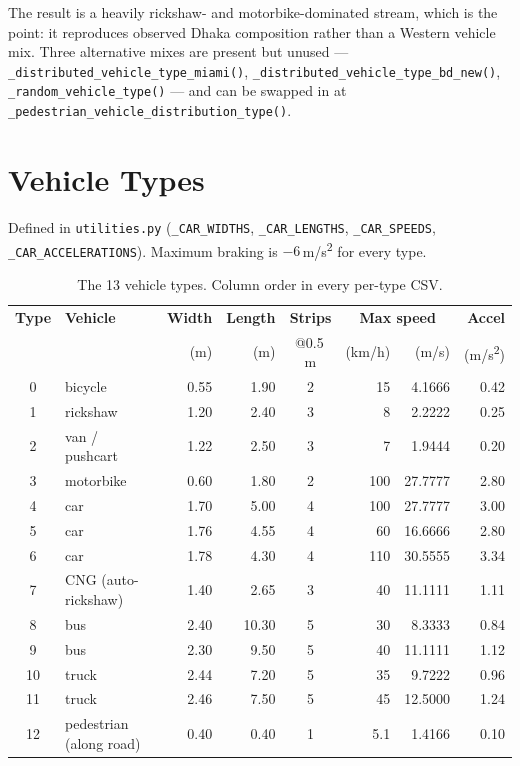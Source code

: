 \documentclass[11pt, a4paper]{article}
\newcommand{\code}[1]{\texttt{#1}}
\begin{document}
The result is a heavily rickshaw- and motorbike-dominated stream, which is the
point: it reproduces observed Dhaka composition rather than a Western vehicle
mix. Three alternative mixes are present but unused ---
\code{\_distributed\_vehicle\_type\_miami()},
\code{\_distributed\_vehicle\_type\_bd\_new()},
\code{\_random\_vehicle\_type()} --- and can be swapped in at
\code{\_pedestrian\_vehicle\_distribution\_type()}.

\section{Vehicle Types}

Defined in \code{utilities.py} (\code{\_CAR\_WIDTHS}, \code{\_CAR\_LENGTHS},
\code{\_CAR\_SPEEDS}, \code{\_CAR\_ACCELERATIONS}). Maximum braking is
$-6$\,m/s\textsuperscript{2} for every type.

\begin{table}[h!]
\centering
\begin{tabular}{c l r r c r r r}
\toprule
\textbf{Type} & \textbf{Vehicle} & \textbf{Width} & \textbf{Length} & \textbf{Strips} & \multicolumn{2}{c}{\textbf{Max speed}} & \textbf{Accel} \\
 & & (m) & (m) & @0.5\,m & (km/h) & (m/s) & (m/s\textsuperscript{2}) \\
\midrule
0  & bicycle                 & 0.55 & 1.90  & 2 & 15  & 4.1666  & 0.42 \\
1  & rickshaw                & 1.20 & 2.40  & 3 & 8   & 2.2222  & 0.25 \\
2  & van / pushcart          & 1.22 & 2.50  & 3 & 7   & 1.9444  & 0.20 \\
3  & motorbike               & 0.60 & 1.80  & 2 & 100 & 27.7777 & 2.80 \\
4  & car                     & 1.70 & 5.00  & 4 & 100 & 27.7777 & 3.00 \\
5  & car                     & 1.76 & 4.55  & 4 & 60  & 16.6666 & 2.80 \\
6  & car                     & 1.78 & 4.30  & 4 & 110 & 30.5555 & 3.34 \\
7  & CNG (auto-rickshaw)     & 1.40 & 2.65  & 3 & 40  & 11.1111 & 1.11 \\
8  & bus                     & 2.40 & 10.30 & 5 & 30  & 8.3333  & 0.84 \\
9  & bus                     & 2.30 & 9.50  & 5 & 40  & 11.1111 & 1.12 \\
10 & truck                   & 2.44 & 7.20  & 5 & 35  & 9.7222  & 0.96 \\
11 & truck                   & 2.46 & 7.50  & 5 & 45  & 12.5000 & 1.24 \\
12 & pedestrian (along road) & 0.40 & 0.40  & 1 & 5.1 & 1.4166  & 0.10 \\
\bottomrule
\end{tabular}
\caption{The 13 vehicle types. Column order in every per-type CSV.}
\end{table}
\end{document}
